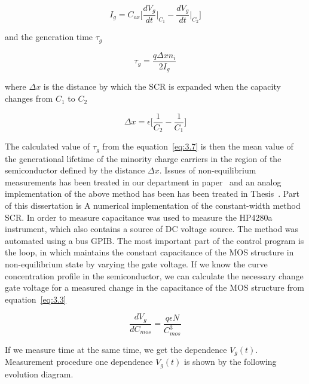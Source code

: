 \begin{equation}\label{eq:3.6}
  I_g = C_{ox} \bigg[\frac{dV_g}{dt}\Big\rvert_{C_1} - \frac{dV_g}{dt}\Big\rvert_{C_2}\bigg]
\end{equation}

and the generation time $\tau_g$

\begin{equation}\label{eq:3.7}
  \tau_g = \frac{q\Delta x n_i}{2I_g}
\end{equation}

where $\Delta x$ is the distance by which the SCR is expanded when the
capacity changes from $C_1$ to $C_2$

\begin{equation}\label{eq:3.8}
  \Delta x = \epsilon \Big[\frac{1}{C_2} - \frac{1}{C_1}\Big]
\end{equation}

The calculated value of $\tau_g$ from the equation~\ref{eq:3.7} is
then the mean value of the generational lifetime of the minority
charge carriers in the region of the semiconductor defined by the
distance $\Delta x$.  Issues of non-equilibrium measurements has been
treated in our department in paper~\cite{1.6} and an analog
implementation of the above method has been has been treated in
Thesis~\cite{3.13}. Part of this dissertation is A numerical
implementation of the constant-width method SCR\@. In order to measure
capacitance was used to measure the HP4280a instrument, which also
contains a source of DC voltage source. The method was automated using
a bus GPIB\@. The most important part of the control program is the
loop, in which maintains the constant capacitance of the MOS structure
in non-equilibrium state by varying the gate voltage.  If we know the
curve concentration profile in the semiconductor, we can calculate
the necessary change gate voltage for a measured change in the
capacitance of the MOS structure from equation~\ref{eq:3.3}

\begin{equation}\label{eq:3.9}
  \frac{dV_g}{dC_{mos}} = \frac{q\epsilon N}{C^3_{mos}}
\end{equation}

If we measure time at the same time, we get the dependence
$V_g(t)$. Measurement procedure one dependence $V_g(t)$ is shown by
the following evolution diagram.

